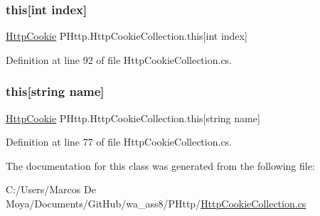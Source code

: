 \subsubsection{\texorpdfstring{this[int index]}{this[int index]}}
{\footnotesize\ttfamily \hyperlink{class_p_http_1_1_http_cookie}{Http\+Cookie} P\+Http.\+Http\+Cookie\+Collection.\+this\mbox{[}int index\mbox{]}\hspace{0.3cm}{\ttfamily [get]}}



Definition at line 92 of file Http\+Cookie\+Collection.\+cs.

\mbox{\label{class_p_http_1_1_http_cookie_collection_ac8f085ce7efcbe454d62e990495600a3}} 
\subsubsection{\texorpdfstring{this[string name]}{this[string name]}}
{\footnotesize\ttfamily \hyperlink{class_p_http_1_1_http_cookie}{Http\+Cookie} P\+Http.\+Http\+Cookie\+Collection.\+this\mbox{[}string name\mbox{]}\hspace{0.3cm}{\ttfamily [get]}}



Definition at line 77 of file Http\+Cookie\+Collection.\+cs.



The documentation for this class was generated from the following file\+:\begin{DoxyCompactItemize}
\item 
C\+:/\+Users/\+Marcos De Moya/\+Documents/\+Git\+Hub/wa\+\_\+ass8/\+P\+Http/\hyperlink{_http_cookie_collection_8cs}{Http\+Cookie\+Collection.\+cs}\end{DoxyCompactItemize}
